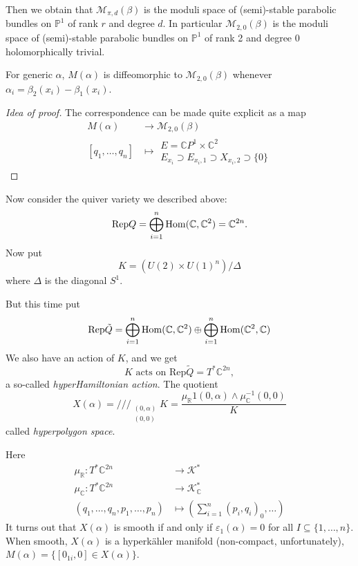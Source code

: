 Then we obtain that
$\mathcal{M}_{\pi,d}(\beta)$
is the moduli space of (semi)-stable
parabolic bundles on $\mathbb{P}^1$
of rank $r$ and degree $d$.
In particular $\mathcal{M}_{2,0}(\beta)$
is the moduli space of (semi)-stable
parabolic
bundles on $\mathbb{P}^1$ of rank 2 and
degree 0
holomorphically trivial.

\begin{theorem}
\label{theorem-Jeffrey-Godinho}
For generic $ \alpha$,
$M(\alpha)$ is diffeomorphic to
$\mathcal{M}_{2,0}(\beta)$
whenever
$\alpha_i=\beta_2(x_i)-\beta_1(x_i)$.
\end{theorem}

\begin{proof}[Idea of proof]
The correspondence can be made quite explicit
as a map
$$
\begin{aligned}
M(\alpha) &\longrightarrow
\mathcal{M}_{2,0}(\beta) \\
[q_1,\ldots,q_n] &\longmapsto
\substack{E=\mathbb{C}P^{1}\times\mathbb{C}^2
 \\ E_{x_i}\supset E_{x_i,1}\supset
 X_{x_i,2}\supset \{0\}}\end{aligned}
$$

\end{proof}

\medskip\noindent
Now consider the quiver variety we described
above:
$$
\text{Rep}Q=\bigoplus_{i=1}^n
\mathop{\mathrm{Hom}}\nolimits(\mathbb{C},\mathbb{C}^2)=\mathbb{C}^{2n}
.
$$
Now put
$$
K=(U(2) \times U(1)^n)/\Delta
$$
where $\Delta$ is the diagonal $S^1$.

But this time put
$$
\text{Rep}\tilde{Q}=\bigoplus_{i=1}^n
\mathop{\mathrm{Hom}}\nolimits(\mathbb{C},\mathbb{C}^2)
\oplus \bigoplus_{i=1}^n
\mathop{\mathrm{Hom}}\nolimits(\mathbb{C}^2,\mathbb{C})
$$
We also have an action of $K$, and we get
$$
K\text{ acts on }\text{Rep}\tilde{Q} = T^*
\mathbb{C}^{2n},
$$
a so-called {\it hyperHamiltonian action}.
The quotient
$$
X(\alpha)=/\!/\!/_{\substack{(0,\alpha) \\
(0,0)}}K=
\frac{\mu_{\mathbb{R}}1(0,\alpha) \wedge
\mu^{-1}_{\mathbb{C}}(0,0)}{K}
$$
called {\it hyperpolygon space}.

Here
$$
\begin{aligned}
\mu_\mathbb{R}:T^*\mathbb{C}^{2n}&\to
\mathcal{K}^* \\
\mu_{\mathbb{C}}:T^*\mathbb{C}^{2n}&  \to
\mathcal{K}_{\mathbb{C}}^* \\
(q_1,\ldots,q_n,p_1,\ldots,p_n)&  \mapsto
(\sum_{i=1}^n(p_i,q_i)_0,\ldots)
\end{aligned}
$$
It turns out that $X(\alpha)$ is smooth
if and only if $\varepsilon_1(\alpha)=0$ for
all
$I \subseteq \{ 1,\ldots,n\}$.
When smooth,  $X(\alpha)$ is a hyperkähler
manifold
(non-compact, unfortunately),
$M(\alpha)=\{[0_{1i},0] \in X(\alpha)\}$.


